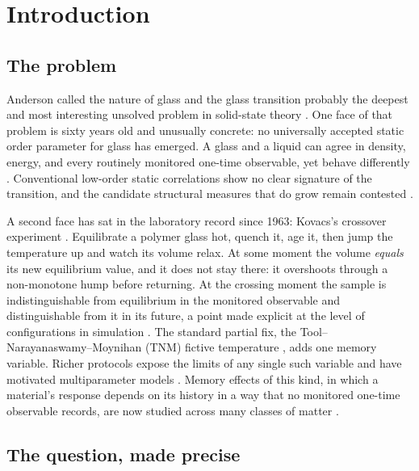 \section{Introduction}
\label{sec:intro}

\subsection{The problem}

Anderson called the nature of glass and the glass transition probably the deepest and most
interesting unsolved problem in solid-state theory \cite{anderson-1995}. One face of that problem
is sixty years old and unusually concrete: no universally accepted static order parameter for
glass has emerged. A glass and a liquid can agree in density, energy, and every routinely
monitored one-time observable, yet behave differently \cite{debenedetti-stillinger-2001}.
Conventional low-order static correlations show no clear signature of the transition, and the
candidate structural measures that do grow remain contested
\cite{berthier-biroli-2011,cavagna-2009,tarjus-2011,royall-williams-2015}.

A second face has sat in the laboratory record since 1963: Kovacs's crossover experiment
\cite{kovacs-1963}. Equilibrate a polymer glass hot, quench it, age it, then jump the temperature
up and watch its volume relax. At some moment the volume \emph{equals} its new equilibrium value,
and it does not stay there: it overshoots through a non-monotone hump before returning. At the
crossing moment the sample is indistinguishable from equilibrium in the monitored observable and
distinguishable from it in its future, a point made explicit at the level of configurations in
simulation \cite{mossa-sciortino-2004}. The standard partial fix, the
Tool--Narayanaswamy--Moynihan (TNM) fictive temperature
\cite{tool-1946,narayanaswamy-1971,moynihan-1976}, adds one memory variable. Richer protocols
expose the limits of any single such variable and have motivated multiparameter models
\cite{ritland-1956,kahr-1979,hodge-1994,mckenna-simon-2017}. Memory effects of this kind, in
which a material's response depends on its history in a way that no monitored one-time
observable records, are now studied across many classes of matter \cite{keim-2019}.

\subsection{The question, made precise}


